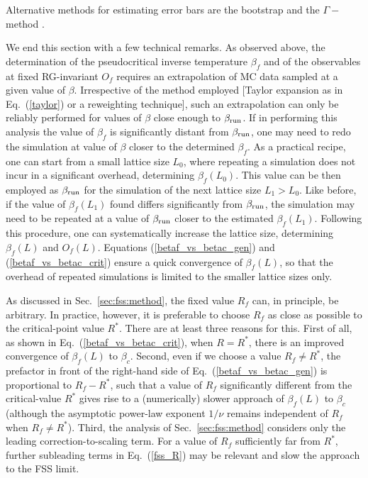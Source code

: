 \documentclass[pre,twocolumn]{revtex4-2}
\begin{document}
Alternative methods for estimating error bars are the bootstrap \cite{Young_notes} and the $\Gamma-$method \cite{Wolff-04,*Wolff-04_erratum}.

We end this section with a few technical remarks.
As observed above,
the determination of the pseudocritical inverse temperature $\beta_f$ and of the observables at fixed RG-invariant $O_f$ requires an extrapolation of MC data sampled at a given value of $\beta$.
Irrespective of the method employed [Taylor expansion as in Eq.~(\ref{taylor}) or a reweighting technique], such an extrapolation can  only be reliably performed for values of $\beta$ close enough to $\beta_{\rm run}$.
If in performing this analysis the value of $\beta_f$ is significantly distant from $\beta_{\rm run}$, one may need to redo the simulation at value of $\beta$ closer to the determined $\beta_f$.
As a practical recipe,
one can start from a small lattice size $L_0$, where repeating a simulation does not incur in a significant overhead, determining $\beta_f(L_0)$.
This value can be then employed as $\beta_{\rm run}$ for the simulation of the next lattice size $L_1 > L_0$.
Like before, if the value of $\beta_f(L_1)$ found differs significantly from $\beta_{\rm run}$, the simulation may need to be repeated at a value of $\beta_{\rm run}$ closer to the estimated $\beta_f(L_1)$.
Following this procedure, one can systematically increase the lattice size, determining $\beta_f(L)$ and $O_f(L)$.
Equations (\ref{betaf_vs_betac_gen}) and (\ref{betaf_vs_betac_crit}) ensure a quick convergence of $\beta_f(L)$, so that the overhead of repeated simulations is limited to the smaller lattice sizes only.

As discussed in Sec.~\ref{sec:fss:method}, the fixed value $R_f$ can, in principle, be arbitrary.
In practice, however, it is preferable to choose $R_f$ as close as possible to the critical-point value $R^*$.
There are at least three reasons for this.
First of all, as shown in Eq.~(\ref{betaf_vs_betac_crit}), when $R=R^*$, there is an improved convergence of $\beta_f(L)$ to $\beta_c$.
Second, even if we choose a value $R_f\ne R^*$, the prefactor in front of the right-hand side of Eq.~(\ref{betaf_vs_betac_gen}) is proportional to $R_f - R^*$, such that a value of $R_f$ significantly different from the critical-value $R^*$ gives rise to a (numerically) slower approach of $\beta_f(L)$ to $\beta_c$ (although the asymptotic power-law exponent $1/\nu$ remains independent of $R_f$ when $R_f\ne R^*$).
Third, the analysis of Sec.~\ref{sec:fss:method} considers only the leading correction-to-scaling term.
For a value of $R_f$ sufficiently far from $R^*$, further subleading terms in Eq.~(\ref{fss_R}) may be relevant and slow the approach to the FSS limit.
\end{document}
